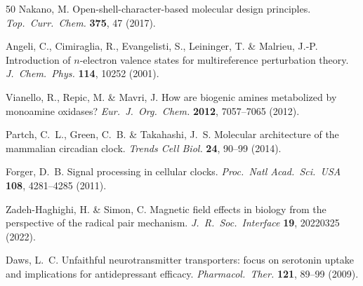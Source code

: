 \documentclass[11pt]{article}
\begin{document}
\begin{thebibliography}{50}
 Nakano, M. Open-shell-character-based molecular design principles. \textit{Top.\ Curr.\ Chem.} \textbf{375}, 47 (2017).

 Angeli, C., Cimiraglia, R., Evangelisti, S., Leininger, T. \& Malrieu, J.-P. Introduction of $n$-electron valence states for multireference perturbation theory. \textit{J.\ Chem.\ Phys.} \textbf{114}, 10252 (2001).

 Vianello, R., Repic, M. \& Mavri, J. How are biogenic amines metabolized by monoamine oxidases? \textit{Eur.\ J.\ Org.\ Chem.} \textbf{2012}, 7057--7065 (2012).

 Partch, C.~L., Green, C.~B. \& Takahashi, J.~S. Molecular architecture of the mammalian circadian clock. \textit{Trends Cell Biol.} \textbf{24}, 90--99 (2014).

 Forger, D.~B. Signal processing in cellular clocks. \textit{Proc.\ Natl Acad.\ Sci.\ USA} \textbf{108}, 4281--4285 (2011).

 Zadeh-Haghighi, H. \& Simon, C. Magnetic field effects in biology from the perspective of the radical pair mechanism. \textit{J.\ R.\ Soc.\ Interface} \textbf{19}, 20220325 (2022).

 Daws, L.~C. Unfaithful neurotransmitter transporters: focus on serotonin uptake and implications for antidepressant efficacy. \textit{Pharmacol.\ Ther.} \textbf{121}, 89--99 (2009).

\end{thebibliography}

\newpage
\end{document}

